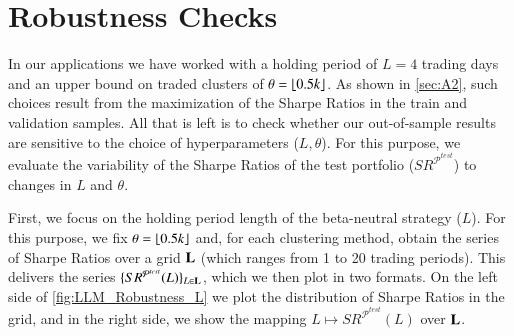 
\section{Robustness Checks} \label{sec:6}

In our applications we have worked with a holding period of $L=4$ trading days and an upper bound on traded clusters of $\theta=\lfloor 0.5k \rfloor$. As shown in \ref{sec:A2}, such choices result from the maximization of the Sharpe Ratios in the train and validation samples. All that is left is to check whether our out-of-sample results are sensitive to the choice of hyperparameters ($L,\theta$). For this purpose, we evaluate the variability of the Sharpe Ratios of the test portfolio ($SR^{\mathcal P^{test}}$) to changes in $L$ and $\theta$. 

\bx 
First, we focus on the holding period length of the beta-neutral strategy ($L$). For this purpose, we fix $\theta=\lfloor 0.5k \rfloor$ and, for each clustering method, obtain the series of Sharpe Ratios over a grid $\mathbf L$ (which ranges from 1 to 20 trading periods). This delivers the series $\{SR^{\mathcal P ^{test}} (L)\}_{L\in\mathbf L}$, which we then plot in two formats. On the left side of \cref{fig:LLM_Robustness_L} we plot the distribution of Sharpe Ratios in the grid, and in the right side, we show the mapping $L\mapsto SR^{\mathcal P ^{test}} (L)$ over $\mathbf L$. 

